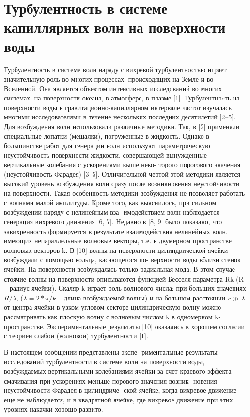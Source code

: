 \chapter{Турбулентность в системе капиллярных волн на поверхности воды}

Турбулентность в системе волн наряду с вихревой турбулентностью играет значительную роль во многих процессах, происходящих на Земле и во Вселенной. Она является объектом интенсивных исследований во многих системах: на поверхности океана, в атмосфере, в плазме [1]. Турбулентноcть на поверхности воды в гравитационно-капиллярном интервале частот изучалась многими исследователями в течение нескольких последних десятилетий [2–5]. Для возбуждения волн использовали различные методики. Так, в [2] применяли специальные лопатки (мешалки), погруженные в жидкость. Однако в большинстве работ для генерации волн используют параметрическую неустойчивость поверхности жидкости, совершающей вынужденные вертикальные колебания с ускорениями выше неко- торого порогового значения (неустойчивость Фарадея) [3–5]. Отличительной чертой этой методики является высокий уровень возбуждения волн сразу после возникновения неустойчивости на поверхности. Такая особенность методики возбуждения не позволяет работать с волнами малой амплитуды. Кроме того, как выяснилось, при сильном возбуждении наряду с нелинейным вза- имодействием волн наблюдается генерация вихревого движения [6, 7]. Недавно в [8, 9] было показано, что завихренность формируется в результате взаимодействия нелинейных волн, имеющих непараллельные волновые векторы, т.е. в двумерном пространстве волновых векторов k. В [10] волны на поверхности цилиндрической ячейки возбуждали с помощью кольца, касающегося по- верхности воды вблизи стенок ячейки. На поверхности возбуждалась только радиальная мода. В этом случае стоячие волны на поверхности описываются функцией Бесселя параметра Rk (R – радиус ячейки). Скаляр k играет роль волнового числа: при больших значениях $R/\lambda$, ($\lambda = 2*\pi/k$ – длина возбуждаемой волны) и на большом расстоянии $r \gg \lambda$ от центра ячейки в узком угловом секторе цилиндрическую волну можно рассматривать как плоскую волну с волновым числом k в одномерном k-пространстве. Экспериментальные результаты [10] оказались в хорошем согласии с теорией слабой (волновой) турбулентности [1].

В настоящем сообщении представлены экспе- риментальные результаты исследований турбулентности в системе волн на поверхности воды, возбуждаемых вертикальными колебаниями ячейки за счет краевого эффекта смачивания при ускорениях меньше порового значения возник- новения неустойчивости Фарадея в цилиндриче- ской ячейке, когда вихревое движение еще не наблюдается, и в квадратной ячейке, где вихревое движение при этих уровнях накачки хорошо развито.

